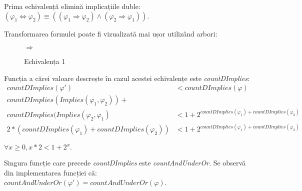Prima echivalență elimină implicațiile duble: $( \varphi_1 \Leftrightarrow \varphi_2) \equiv ((\varphi_1 \Rightarrow \varphi_2) \land (\varphi_2 \Rightarrow \varphi_1)).$

Transformarea formulei poate fi vizualizată mai ușor utilizând arbori:

\begin{figure}[H]
\caption{Echivalența 1}
\centering
{}
  $\Rightarrow$ %
  
\end{figure}

Funcția a cărei valoare descrește în cazul acestei echivalențe este \textit{countDImplies}:
\begin{align*}
	countDImplies(\varphi') &<
		countDImplies(\varphi) \\
	countDImplies(Implies(\varphi_1, \varphi_2)) + & \\
    countDImplies(Implies(\varphi_2, \varphi_1) &< 
    	 1 + 2 ^ {countDImplies(\varphi_1) + countDImplies(\varphi_2)} \\
    2 * ( countDImplies(\varphi_1) + countDImplies(\varphi_2)) &< 
    	1 + 2 ^ {countDImplies(\varphi_1) + countDImplies(\varphi_2)} 
\end{align*}

\begin{remark}
$\forall x \geq 0, x * 2 < 1 + 2 ^ x.$
\end{remark}

Singura funcție care precede \textit{countDImplies} este \textit{countAndUnderOr}. Se observă din implementarea funcției că: $countAndUnderOr(\varphi') = countAndUnderOr(\varphi)$.


